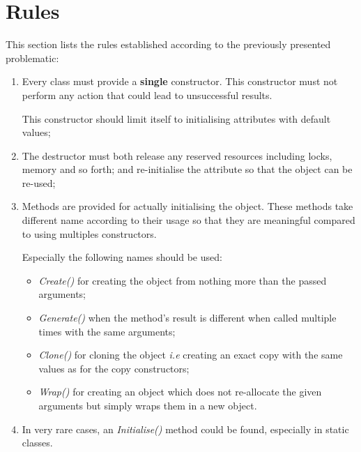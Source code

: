 \documentclass[10pt,a4wide]{article}
\newcommand\ie[0]{\textit{i.e}}
\begin{document}
\section{Rules}

This section lists the rules established according to the previously presented
problematic:

\begin{enumerate}
  \item
    Every class must provide a \textbf{single} constructor. This constructor
    must not perform any action that could lead to unsuccessful results.

    \-

    This constructor should limit itself to initialising attributes with
    default values;
  \item
    The destructor must both release any reserved resources including
    locks, memory and so forth; and re-initialise the attribute so that
    the object can be re-used;
  \item
    Methods are provided for actually initialising the object. These methods
    take different name according to their usage so that they are meaningful
    compared to using multiples constructors.

    \-

    Especially the following names should be used:

    \begin{itemize}
      \item
	\textit{Create()} for creating the object from nothing more than
	the passed arguments;
      \item
	\textit{Generate()} when the method's result is different when called
	multiple times with the same arguments;
      \item
	\textit{Clone()} for cloning the object \ie{} creating an exact
	copy with the same values as for the copy constructors;
      \item
	\textit{Wrap()} for creating an object which does not re-allocate
	the given arguments but simply wraps them in a new object.
    \end{itemize}
  \item
    In very rare cases, an \textit{Initialise()} method could be found,
    especially in static classes.
\end{enumerate}
\end{document}
